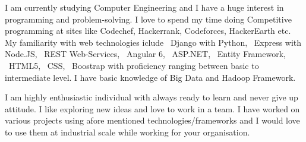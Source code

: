 \documentclass[11pt, a4paper]{awesome-cv} %
\begin{document}
\makecvheader %

\makelettertitle %


\begin{cvletter}



I am currently studying Computer Engineering and I have a huge interest in programming and problem-solving. I love to spend my time doing Competitive programming at sites like Codechef, Hackerrank, Codeforces, HackerEarth etc.
My familiarity with web technologies iclude ~Django with Python, ~Express with Node.JS, ~REST Web-Services, ~Angular 6, ~ASP.NET, ~Entity Framework, ~HTML5, ~CSS, ~Boostrap with proficiency ranging between basic to intermediate level.
I have basic knowledge of Big Data and Hadoop Framework.



I am highly enthusiastic individual with always ready to learn and never give up attitude. I like exploring new ideas and love to work in a team. I have worked on various projects using afore mentioned technologies/frameworks and I would love to use them at industrial scale while working for your organisation.


\end{cvletter}


\makeletterclosing %
\end{document}
